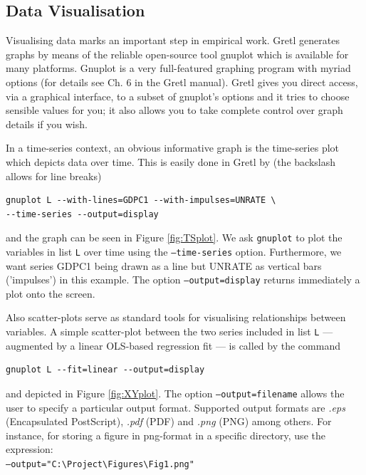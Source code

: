 \documentclass[11pt]{article}
\begin{document}
\subsection{Data Visualisation}
Visualising data marks an important step in empirical work. Gretl generates graphs by means of the reliable open-source tool gnuplot which is available for many platforms. Gnuplot is a very full-featured graphing program with myriad options (for details see Ch. 6 in the Gretl manual). Gretl gives you direct access, via a graphical interface, to a subset of gnuplot’s options and it tries to choose sensible values for you; it also allows you to take complete control over graph details if you wish.

In a time-series context, an obvious informative graph is the time-series plot which depicts data over time. This is easily done in Gretl by (the backslash allows for line breaks)
\begin{Verbatim}[baselinestretch=0.75, fontsize=\small]
gnuplot L --with-lines=GDPC1 --with-impulses=UNRATE \
--time-series --output=display
\end{Verbatim}
and the graph can be seen in Figure \ref{fig:TSplot}. We ask \texttt{gnuplot} to plot the variables in list \texttt{L} over time using the \texttt{---time-series} option. Furthermore, we want series GDPC1 being drawn as a line but UNRATE as vertical bars ('impulses') in this example. The option \texttt{---output=display} returns immediately a plot onto the screen.

Also scatter-plots serve as standard tools for visualising relationships between variables. A simple scatter-plot between the two series included in list \texttt{L} --- augmented by a linear OLS-based regression fit --- is called by the command
\begin{Verbatim}[baselinestretch=0.75, fontsize=\small]
gnuplot L --fit=linear --output=display
\end{Verbatim}
and depicted in Figure \ref{fig:XYplot}. 
The option \texttt{---output=filename} allows the user to specify a particular output format. Supported output formats are \textit{.eps} (Encapsulated PostScript), \textit{.pdf} (PDF) and \textit{.png} (PNG) among others. For instance, for storing a figure in png-format in a specific directory, use the expression: \\
\texttt{---output="C:\textbackslash{Project}\textbackslash{Figures}\textbackslash{Fig1}.png"}
\end{document}
